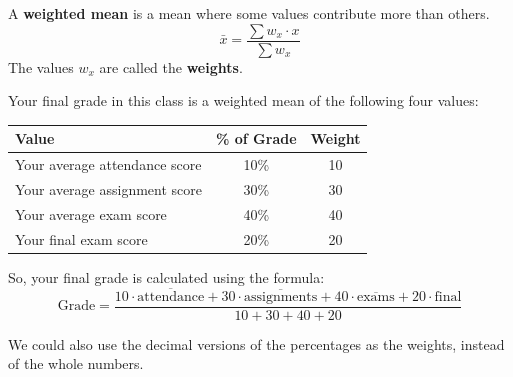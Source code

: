 \documentclass[handout]{beamer}
\begin{document}
\begin{frame}
\begin{definition}
A \textbf{weighted mean} is a mean where some values contribute more than others. 
\begin{equation*}
\bar{x}=\dfrac{\sum w_x\cdot x}{\sum w_x}
\end{equation*}
The values $w_x$ are called the \textbf{weights}.
\end{definition}
\end{frame}

\begin{frame}
\begin{example}
Your final grade in this class is a weighted mean of the following four values:
\begin{center}
\begin{tabular}{l|c|c}
Value & \% of Grade & Weight \\\hline
Your average attendance score & 10\% & 10 \\\pause
Your average assignment score & 30\% & 30 \\\pause
Your average exam score & 40\% & 40 \\\pause
Your final exam score & 20\% & 20
\end{tabular}
\end{center}\pause
So, your final grade is calculated using the formula:
\begin{equation*}
\text{Grade} = \dfrac{10\cdot\overline{\text{attendance}} + 30\cdot\overline{\text{assignments}} + 40\cdot\overline{\text{exams}} + 20\cdot\text{final}}{10+30+40+20}
\end{equation*}
\end{example}\pause

\begin{note}
We could also use the decimal versions of the percentages as the weights, instead of the whole numbers.
\end{note}
\end{frame}
\end{document}
